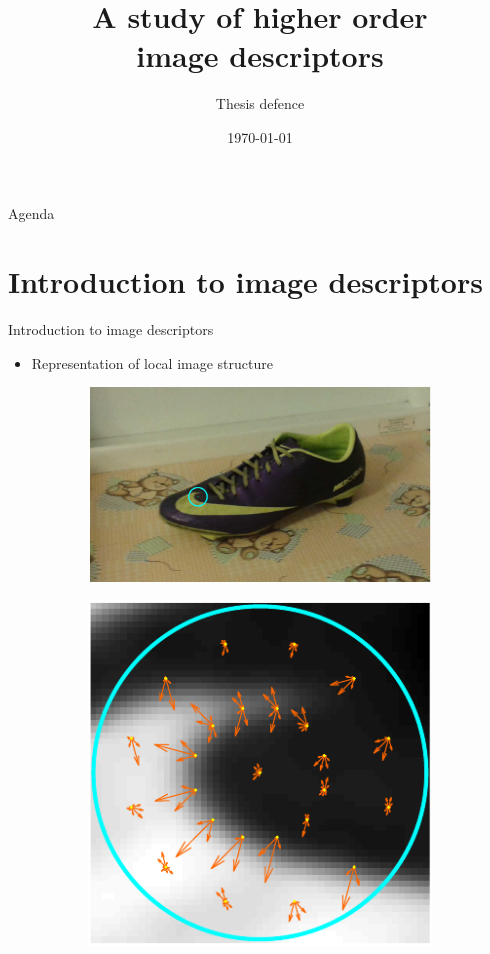 \documentclass[14pt,t]{beamer}
\title{A study of higher order \\ image descriptors}
\subtitle{Thesis defence}
\author[Benjamin M. Braithwaite \\\and Malte S. Nissen]{Benjamin M. Braithwaite \\\and Malte S. Nissen\\\\ \small{Supervisors:\\Kim S. Pedersen\\\and Sune Darkner}\\}
\institute{Department of Computer Science}
\date[]{\today}
\begin{document}
%
\frame[plain]{\titlepage}
%
\begin{frame}{Agenda}
	\tableofcontents
\end{frame}
%
\section{Introduction to image descriptors}
%
\begin{frame}{Introduction to image descriptors}
\begin{itemize}
\item Representation of local image structure
\end{itemize}
\begin{figure}
\centering
	\begin{subfigure}[t]{0.58\textwidth}
		\includegraphics[width=\textwidth, clip=true, trim=165 50 155 68]{img/shoeDescriptor.pdf}
	\end{subfigure}
	\begin{subfigure}[t]{0.40\textwidth}
		\includegraphics[width=\textwidth, clip=true, trim=1 1 1 1]{img/shoeDescriptorZoom.pdf}
	\end{subfigure}
\end{figure}
\end{frame}
\end{document}
